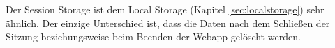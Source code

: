 \label{sec:sessionstorage}

Der Session Storage ist dem Local Storage (Kapitel \ref{sec:localstorage}) sehr ähnlich. 
Der einzige Unterschied ist, dass die Daten nach dem Schließen der Sitzung beziehungsweise beim Beenden der Webapp gelöscht werden. \cite{MDNSessionStorage}


